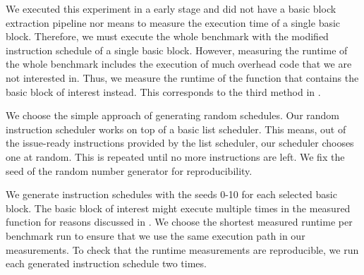 We executed this experiment in a early stage and did not have a basic block extraction pipeline nor means to measure the execution time of a single basic block.
Therefore, we must execute the whole benchmark with the modified instruction schedule of a single basic block.
However, measuring the runtime of the whole benchmark includes the execution of much overhead code that we are not interested in.
Thus, we measure the runtime of the function that contains the basic block of interest instead.
This corresponds to the third method in .

We choose the simple approach of generating random schedules.
Our random instruction scheduler works on top of a basic list scheduler.
This means, out of the issue-ready instructions provided by the list scheduler, our scheduler chooses one at random.
This is repeated until no more instructions are left.
We fix the seed of the random number generator for reproducibility.

We generate instruction schedules with the seeds 0-10 for each selected basic block.
The basic block of interest might execute multiple times in the measured function for reasons discussed in .
We choose the shortest measured runtime per benchmark run to ensure that we use the same execution path in our measurements.
To check that the runtime measurements are reproducible, we run each generated instruction schedule two times.

